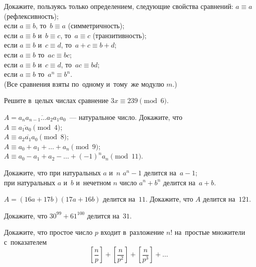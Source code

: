\begin{problems}

\item
Докажите, пользуясь только определением, следующие свойства сравнений:
\sbp $a \equiv a$ (рефлексивность);
\\
\sbp если $a \equiv b$, то~$b \equiv a$ (симметричность);
\\
\sbp если $a \equiv b$ и~$b \equiv c$, то~$a \equiv c$ (транзитивность);
\\
\sbp если $a \equiv b$ и~$c \equiv d$, то~$a + c \equiv b + d$;
\\
\sbp если $a \equiv b$ то~$ac \equiv bc$;
\\
\sbp если $a \equiv b$ и~$c \equiv d$, то~$ac \equiv bd$;
\\
\sbp если $a \equiv b$ то~$a^n \equiv b^n$.
\\
(Все сравнения взяты по~одному и~тому~же модулю $m$.)

\item
Решите в~целых числах сравнение $3 x \equiv 239 \pmod 6$.

\item
$A = \overline{a_n a_{n-1} \ldots a_2 a_1 a_0}$~--- натуральное число.
Докажите, что
\\
\sbp $A \equiv \overline{a_1 a_0} \pmod 4$;
\\
\sbp $A \equiv \overline{a_2 a_1 a_0} \pmod 8$;
\\
\sbp $A \equiv a_0 + a_1 + \ldots + a_n \pmod 9$;
\\
\sbp $A \equiv a_0 - a_1 + a_2 - \ldots + (-1)^n a_n \pmod {11}$.

\item
Докажите, что
\sbp при натуральных $a$ и~$n$ \quad $a^n-1$ делится на~$a-1$;
\\
\sbp при натуральных $a$ и~$b$ и~нечетном $n$ число $a^n + b^n$ делится
на~$a + b$.

\item
$A = (16 a + 17 b) (17 a + 16 b)$ делится на~$11$.
Докажите, что $A$ делится на~$121$.

\item
Докажите, что $30^{99} + 61^{100}$ делится на~$31$.

\item
Докажите, что простое число $p$ входит в~разложение $n!$ на~простые множители
с~показателем
\[
    \left[  \frac{n}{p}  \right] +
    \left[ \frac{n}{p^2} \right] +
    \left[ \frac{n}{p^3} \right] + \ldots
\]

\end{problems}

